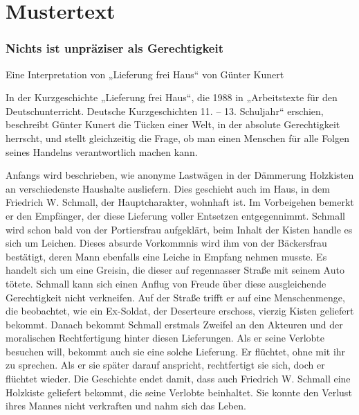 


\section{Mustertext}

\subsubsection{Nichts ist unpräziser als Gerechtigkeit }
Eine Interpretation von „Lieferung frei Haus“ von Günter Kunert 

In der Kurzgeschichte „Lieferung frei Haus“, die 1988 in „Arbeitstexte für den Deutschunterricht. Deutsche Kurzgeschichten 11. – 13. Schuljahr“ erschien, beschreibt Günter Kunert die Tücken einer Welt, in der absolute Gerechtigkeit herrscht, und stellt gleichzeitig die Frage, ob man einen Menschen für alle Folgen seines Handelns verantwortlich machen kann.  

Anfangs wird beschrieben, wie anonyme Lastwägen in der Dämmerung Holzkisten an verschiedenste Haushalte ausliefern. Dies geschieht auch im Haus, in dem Friedrich W. Schmall, der Hauptcharakter, wohnhaft ist. Im Vorbeigehen bemerkt er den Empfänger, der diese Lieferung voller Entsetzen entgegennimmt. Schmall wird schon bald von der Portiersfrau aufgeklärt, beim Inhalt der Kisten handle es sich um Leichen. Dieses absurde Vorkommnis wird ihm von der Bäckersfrau bestätigt, deren Mann ebenfalls eine Leiche in Empfang nehmen musste. Es handelt sich um eine Greisin, die dieser auf regennasser Straße mit seinem Auto tötete. Schmall kann sich einen Anflug von Freude über diese ausgleichende Gerechtigkeit nicht verkneifen. Auf der Straße trifft er auf eine Menschenmenge, die beobachtet, wie ein Ex-Soldat, der Deserteure erschoss, vierzig Kisten geliefert bekommt. Danach bekommt Schmall erstmals Zweifel an den Akteuren und der moralischen Rechtfertigung hinter diesen Lieferungen. Als er seine Verlobte besuchen will, bekommt auch sie eine solche Lieferung. Er flüchtet, ohne mit ihr zu sprechen. Als er sie später darauf anspricht, rechtfertigt sie sich, doch er flüchtet wieder. Die Geschichte endet damit, dass auch Friedrich W. Schmall eine Holzkiste geliefert bekommt, die seine Verlobte beinhaltet. Sie konnte den Verlust ihres Mannes nicht verkraften und nahm sich das Leben.  

